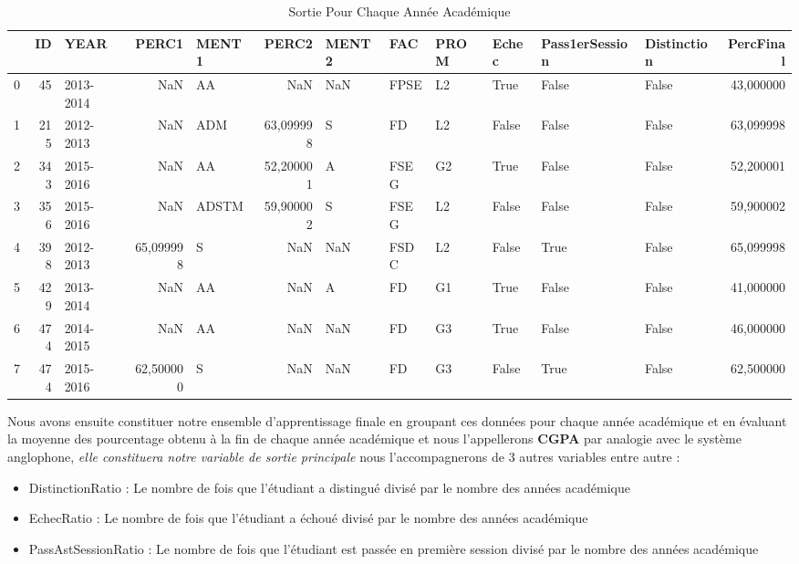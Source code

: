\begin{table}
	\centering
	\begingroup %
	\captionsetup{type=table} %
	\caption{Sortie Pour Chaque Année Académique}
	\label{tab:Output1}
	\begin{tabular}{lrlrlrllllllr}
		\toprule
		{} &   ID &   YEAR &      PERC1 &  MENT1 &      PERC2 & MENT2 &   FAC & PROM &  Echec & Pass1erSession & Distinction &  PercFinal \\
		\midrule
		0 &   45 &  2013-2014 &        NaN &     AA &        NaN &   NaN &  FPSE &   L2 &   True &          False &       False &  43,000000 \\
		1 &  215 &  2012-2013 &        NaN &    ADM &  63,099998 &     S &    FD &   L2 &  False &          False &       False &  63,099998 \\
		2 &  343 &  2015-2016 &        NaN &     AA &  52,200001 &     A &  FSEG &   G2 &   True &          False &       False &  52,200001 \\
		3 &  356 &  2015-2016 &        NaN &  ADSTM &  59,900002 &     S &  FSEG &   L2 &  False &          False &       False &  59,900002 \\
		4 &  398 &  2012-2013 &  65,099998 &      S &        NaN &   NaN &  FSDC &   L2 &  False &           True &       False &  65,099998 \\
		5 &  429 &  2013-2014 &        NaN &     AA &        NaN &     A &    FD &   G1 &   True &          False &       False &  41,000000 \\
		6 &  474 &  2014-2015 &        NaN &     AA &        NaN &   NaN &    FD &   G3 &   True &          False &       False &  46,000000 \\
		7 &  474 &  2015-2016 &  62,500000 &      S &        NaN &   NaN &    FD &   G3 &  False &           True &       False &  62,500000 \\
		\bottomrule
	\end{tabular}
	\endgroup
\end{table}
 Nous avons ensuite constituer notre ensemble d'apprentissage finale en groupant ces données pour chaque année académique et en évaluant 
 la moyenne des pourcentage obtenu à la fin de chaque année académique  et nous l'appellerons \textbf{\ac{CGPA} }par analogie avec le système anglophone, \emph{elle constituera notre variable de sortie principale}  nous l'accompagnerons de 3 autres variables entre autre :
 \begin{itemize}
 	\item
 	DistinctionRatio : Le nombre de fois que l'étudiant a distingué
 	divisé par le nombre des années académique
 	\item
 	EchecRatio : Le nombre de fois que l'étudiant a échoué divisé par le
 	nombre des années académique
 	\item
 	PassAstSessionRatio : Le nombre de fois que l'étudiant est passée en
 	première session divisé par le nombre des années académique
 \end{itemize}
